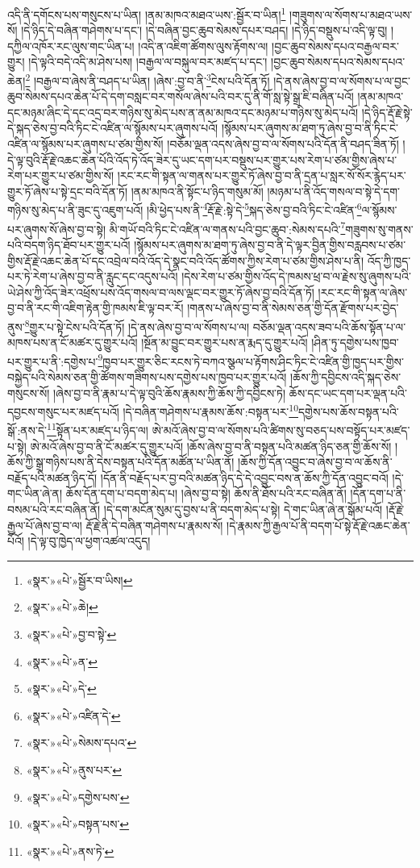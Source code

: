 འདི་ནི་དགོངས་པས་གསུངས་པ་ཡིན། །ནམ་མཁའ་མཐའ་ཡས་:སྦྱོར་བ་ཡིན།\footnote{«སྣར་»«པེ་»སྦྱོར་བ་ཡིས།} །གཟུགས་ལ་སོགས་པ་མཐའ་ཡས་སོ། །དེ་ཉིད་དེ་བཞིན་གཤེགས་པ་དང་། །དེ་བཞིན་བྱང་ཆུབ་སེམས་དཔར་བཤད། །དེ་ཉིད་བསྡུས་པ་འདི་ལྟ་བུ། །དཀྱིལ་འཁོར་རང་ལུས་གང་ཡིན་པ། །འདི་ན་འཇིག་ཚོགས་ལུས་རྟོགས་ལ། །བྱང་ཆུབ་སེམས་དཔའ་བརྒྱལ་བར་གྱུར། །དེ་ལྟའི་བདེ་འདི་མ་ཤེས་པས། །བརྒྱལ་ལ་བསྐུལ་བར་མཛད་པ་དང་། །བྱང་ཆུབ་སེམས་དཔའ་སེམས་དཔའ་ཆེན།\footnote{«སྣར་»«པེ་»ཆེ།} །བརྒྱལ་བ་ཞེས་ནི་བཤད་པ་ཡིན། །ཞེས་:བྱ་བ་ནི་\footnote{«སྣར་»«པེ་»བྱ་བ་སྟེ་}ངེས་པའི་དོན་ཏོ། །དེ་ནས་ཞེས་བྱ་བ་ལ་སོགས་པ་ལ་བྱང་ཆུབ་སེམས་དཔའ་ཆེན་པོ་དེ་དག་བསླང་བར་གསོལ་ཞེས་པའི་བར་དུ་ནི་གོ་སླ་སྟེ་སྒྲ་ཇི་བཞིན་པའོ། །ནམ་མཁའ་དང་མཉམ་ཞིང་དེ་དང་འདྲ་བར་གཉིས་སུ་མེད་པས་ན་ནམ་མཁའ་དང་མཉམ་པ་གཉིས་སུ་མེད་པའོ། །དེ་ཉིད་རྡོ་རྗེ་སྟེ་དེ་སྐད་ཅེས་བྱ་བའི་ཏིང་ངེ་འཛིན་ལ་སྙོམས་པར་ཞུགས་པའོ། །སྙོམས་པར་ཞུགས་མ་ཐག་ཏུ་ཞེས་བྱ་བ་ནི་ཏིང་ངེ་འཛིན་ལ་སྙོམས་པར་ཞུགས་པ་ཙམ་གྱིས་སོ། །བཅོམ་ལྡན་འདས་ཞེས་བྱ་བ་ལ་སོགས་པའི་དོན་ནི་བཤད་ཟིན་ཏོ། །དེ་ལྟ་བུའི་རྡོ་རྗེ་འཆང་ཆེན་པོའི་འོད་ཏེ་འོད་ཟེར་དུ་ཡང་དག་པར་བསྡུས་པར་གྱུར་པས་རེག་པ་ཙམ་གྱིས་ཞེས་པ་རེག་པར་གྱུར་པ་ཙམ་གྱིས་སོ། །རང་རང་གི་སྟན་ལ་གནས་པར་གྱུར་ཏོ་ཞེས་བྱ་བ་ནི་དྲན་པ་སླར་སོ་སོར་རྙེད་པར་གྱུར་ཏོ་ཞེས་པ་སྟེ་དྲང་བའི་དོན་ཏོ། །ནམ་མཁའ་ནི་སྟོང་པ་ཉིད་གསུམ་མོ། །མཉམ་པ་ནི་འོད་གསལ་བ་སྟེ་དེ་དག་གཉིས་སུ་མེད་པ་ནི་ཟུང་དུ་འཇུག་པའོ། །མི་ཕྱེད་པས་ནི་\footnote{«སྣར་»«པེ་»ན་}རྡོ་རྗེ་:སྟེ་དེ་\footnote{«སྣར་»«པེ་»དེ་}སྐད་ཅེས་བྱ་བའི་ཏིང་ངེ་འཛིན་\footnote{«སྣར་»«པེ་»འཛིན་དེ་}ལ་སྙོམས་པར་ཞུགས་སོ་ཞེས་བྱ་བ་སྟེ། མི་གཡོ་བའི་ཏིང་ངེ་འཛིན་ལ་གནས་པའི་བྱང་ཆུབ་:སེམས་དཔའི་\footnote{«སྣར་»«པེ་»སེམས་དཔའ་}གཟུགས་སུ་གནས་པའི་བདག་ཉིད་ཐོབ་པར་གྱུར་པའོ། །སྙོམས་པར་ཞུགས་མ་ཐག་ཏུ་ཞེས་བྱ་བ་ནི་དེ་ལྟར་བྱིན་གྱིས་བརླབས་པ་ཙམ་གྱིས་རྡོ་རྗེ་འཆང་ཆེན་པོ་དང་འབྲེལ་བའི་འོད་དེ་སྣང་བའི་འོད་ཚོགས་ཀྱིས་རེག་པ་ཙམ་གྱིས་ཤེས་པ་ནི། འོད་ཀྱི་ཁྱད་པར་ཏེ་རེག་པ་ཞེས་བྱ་བ་ནི་རླུང་དང་འདུས་པའོ། །དེས་རེག་པ་ཙམ་གྱིས་འོད་དེ་ཁམས་ཕྲ་བ་ལ་རྗེས་སུ་ཞུགས་པའི་ཡེ་ཤེས་ཀྱི་འོད་ཟེར་འཕྲོས་པས་འོད་གསལ་བ་ལས་ལྡང་བར་གྱུར་ཏོ་ཞེས་བྱ་བའི་དོན་ཏོ། །རང་རང་གི་སྟན་ལ་ཞེས་བྱ་བ་ནི་རང་གི་འཇིག་རྟེན་གྱི་ཁམས་ཇི་ལྟ་བར་རོ། །གནས་པ་ཞེས་བྱ་བ་ནི་སེམས་ཅན་གྱི་དོན་རྫོགས་པར་བྱེད་ནུས་\footnote{«སྣར་»«པེ་»ནུས་པར་}གྱུར་པ་སྟེ་ངེས་པའི་དོན་ཏོ། །དེ་ནས་ཞེས་བྱ་བ་ལ་སོགས་པ་ལ། བཅོམ་ལྡན་འདས་ཟབ་པའི་ཆོས་སྟོན་པ་ལ་མཁས་པས་ན་ངོ་མཚར་དུ་གྱུར་པའོ། །སྔོན་མ་བྱུང་བར་གྱུར་པས་ན་རྨད་དུ་གྱུར་པའོ། །ཤིན་ཏུ་དགྱེས་པས་ཁྱབ་པར་གྱུར་པ་ནི་:དགྱེས་པ་\footnote{«སྣར་»«པེ་»དགྱེས་པས་}ཁྱབ་པར་གྱུར་ཅིང་རངས་ཏེ་བཀའ་སྩལ་པ་རྟོགས་ཤིང་ཏིང་ངེ་འཛིན་གྱི་ཁྱད་པར་གྱིས་བསྐྱེད་པའི་སེམས་ཅན་གྱི་ཚོགས་གཟིགས་པས་དགྱེས་པས་ཁྱབ་པར་གྱུར་པའོ། །ཆོས་ཀྱི་དབྱིངས་འདི་སྐད་ཅེས་གསུངས་སོ། །ཞེས་བྱ་བ་ནི་རྣམ་པ་དེ་ལྟ་བུའི་ཆོས་རྣམས་ཀྱི་ཆོས་ཀྱི་དབྱིངས་ཏེ། ཆོས་དང་ཡང་དག་པར་ལྡན་པའི་དབྱངས་གསུང་པར་མཛད་པའོ། །དེ་བཞིན་གཤེགས་པ་རྣམས་ཆོས་:བསྟན་པར་\footnote{«སྣར་»«པེ་»བསྟན་པས་}དགྱེས་པས་ཆོས་བསྟན་པའི་སྒོ་:ནས་དེ་\footnote{«སྣར་»«པེ་»ནས་ཏེ་}སྟོན་པར་མཛད་པ་ཉིད་ལ། ཨེ་མའོ་ཞེས་བྱ་བ་ལ་སོགས་པའི་ཚིགས་སུ་བཅད་པས་བསྟོད་པར་མཛད་པ་སྟེ། ཨེ་མའོ་ཞེས་བྱ་བ་ནི་ངོ་མཚར་དུ་གྱུར་པའོ། །ཆོས་ཞེས་བྱ་བ་ནི་བསྟན་པའི་མཚན་ཉིད་ཅན་གྱི་ཆོས་སོ། །ཆོས་ཀྱི་སྒྲ་གཉིས་པས་ནི་དེས་བསྟན་པའི་དོན་མཚོན་པ་ཡིན་ནོ། །ཆོས་ཀྱི་དོན་འབྱུང་བ་ཞེས་བྱ་བ་ལ་ཆོས་ནི་བརྗོད་པའི་མཚན་ཉིད་དོ། །དོན་ནི་བརྗོད་པར་བྱ་བའི་མཚན་ཉིད་དེ་དེ་འབྱུང་བས་ན་ཆོས་ཀྱི་དོན་འབྱུང་བའོ། །དེ་གང་ཡིན་ཞེ་ན། ཆོས་དོན་དག་པ་བདག་མེད་པ། །ཞེས་བྱ་བ་སྟེ། ཆོས་ནི་ཐོས་པའི་རང་བཞིན་ནོ། །དོན་དག་པ་ནི་བསམ་པའི་རང་བཞིན་ནོ། །དེ་དག་མངོན་སུམ་དུ་བྱས་པ་ནི་བདག་མེད་པ་སྟེ། དེ་གང་ཡིན་ཞེ་ན་སྒོམ་པའོ། །རྡོ་རྗེ་རྒྱལ་པོ་ཞེས་བྱ་བ་ལ། རྡོ་རྗེ་ནི་དེ་བཞིན་གཤེགས་པ་རྣམས་སོ། །དེ་རྣམས་ཀྱི་རྒྱལ་པོ་ནི་བདག་པོ་སྟེ་རྡོ་རྗེ་འཆང་ཆེན་པོའོ། །དེ་ལྟ་བུ་ཁྱེད་ལ་ཕྱག་འཚལ་འདུད། 